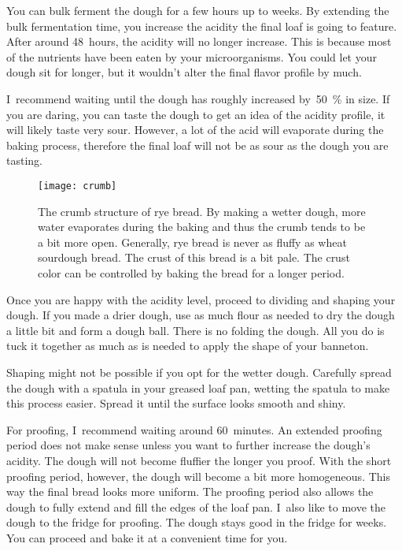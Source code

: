 You can bulk ferment the dough for a few hours up to
weeks. By extending the bulk fermentation time, you increase
the acidity the final loaf is going to feature. After around
48~hours, the acidity will no longer increase. This is because
most of the nutrients have been eaten by your microorganisms.
You could let your dough sit for longer, but it wouldn't alter the
final flavor profile by much.

I~recommend waiting until the dough has roughly increased
by~\qty{50}{\percent} in size. If you are daring, you can taste the dough to
get an idea of the acidity profile, it will likely taste very sour. However, a
lot of the acid will evaporate during the baking process, therefore the final
loaf will not be as sour as the dough you are tasting.

\begin{figure}[!htb]
  \texttt{[image: crumb]}
  \caption[Rye bread]{The crumb structure of rye bread. By making a wetter
  dough, more water evaporates during the baking and thus the
  crumb tends to be a bit more open. Generally, rye
  bread is never as fluffy as wheat sourdough bread. The crust
  of this bread is a bit pale. The crust color can be controlled
  by baking the bread for a longer period.}%
  \label{fig:rye-crumb}
\end{figure}

Once you are happy with the acidity level, proceed to dividing
and shaping your dough.  If you made a drier dough, use as much
flour as needed to dry the dough a little bit and form a dough ball.
There is no folding the dough. All you do is tuck it together
as much as is needed to apply the shape of your banneton.

Shaping might not be possible if you opt for the wetter dough. Carefully spread
the dough with a spatula in your greased loaf pan, wetting the spatula to make
this process easier. Spread it until the surface looks smooth and shiny.

For proofing, I~recommend waiting around 60~minutes. An extended
proofing period does not make sense unless you want to further
increase the dough's acidity. The dough will not become fluffier
the longer you proof. With the short proofing period, however,
the dough will become a bit more homogeneous. This way the final
bread looks more uniform. The proofing period also allows the
dough to fully extend and fill the edges of the loaf pan. I~also
like to move the dough to the fridge for proofing. The dough stays
good in the fridge for weeks. You can proceed and bake it at a
convenient time for you.

